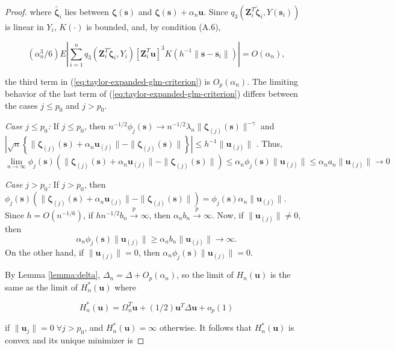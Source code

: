 \documentclass[authoryear,review, 12pt]{elsarticle}
\begin{document}
\begin{proof}
where $\tilde{\bm{\zeta}_{i}}$ lies between $\bm{\zeta}(\bm{s})$
and $\bm{\zeta}(\bm{s})+\alpha_{n}\bm{u}$. Since $q_{3}\left(\bm{Z}_{i}^{T}\tilde{\bm{\zeta}}_{i},Y\left(\bm{s}_{i}\right)\right)$
is linear in $Y_{i}$, $K\left(\cdot\right)$ is bounded, and, by
condition (A.6),

\[
\left(\alpha_{n}^{3}/6\right)E\left|\sum_{i=1}^{n}q_{3}\left(\bm{Z}_{i}^{T}\tilde{\bm{\zeta}}_{i},Y_{i}\right)\left[\bm{Z}_{i}^{T}\bm{u}\right]^{3}K\left(h^{-1}\|\bm{s}-\bm{s}_{i}\|\right)\right|=O\left(\alpha_{n}\right),
\]


the third term in (\ref{eq:taylor-expanded-glm-criterion}) is $O_{p}\left(\alpha_{n}\right)$.
The limiting behavior of the last term of (\ref{eq:taylor-expanded-glm-criterion})
differs between the cases $j\le p_{0}$ and $j>p_{0}$.

\emph{Case $j\le p_{0}$:} If $j\le p_{0}$, then $n^{-1/2}\phi_{j}(\bm{s})\to n^{-1/2}\lambda_{n}\|\bm{\zeta}_{\left(j\right)}(\bm{s})\|^{-\gamma}$
and $|\sqrt{n}\left\{ \|\bm{\zeta}_{\left(j\right)}(\bm{s})+\alpha_{n}\bm{u}_{\left(j\right)}\|-\|\bm{\zeta}_{\left(j\right)}(\bm{s})\|\right\} |\le h^{-1}\|\bm{u}_{\left(j\right)}\|$
. Thus, 
\[
\lim\limits _{n\to\infty}\phi_{j}(\bm{s})\left(\|\bm{\zeta}_{\left(j\right)}(\bm{s})+\alpha_{n}\bm{u}_{\left(j\right)}\|-\|\bm{\zeta}_{\left(j\right)}(\bm{s})\|\right)\le\alpha_{n}\phi_{j}(\bm{s})\|\bm{u}_{\left(j\right)}\|\le\alpha_{n}a_{n}\|\bm{u}_{\left(j\right)}\|\to0
\]


\emph{Case $j>p_{0}$:} If $j>p_{0}$, then $\phi_{j}(\bm{s})\left(\|\bm{\zeta}_{\left(j\right)}(\bm{s})+\alpha_{n}\bm{u}_{\left(j\right)}\|-\|\bm{\zeta}_{\left(j\right)}(\bm{s})\|\right)=\phi_{j}(\bm{s})\alpha_{n}\|\bm{u}_{\left(j\right)}\|$.
Since $h=O(n^{-1/6})$, if $hn^{-1/2}b_{n}\xrightarrow{p}\infty$,
then $\alpha_{n}b_{n}\xrightarrow{p}\infty$. Now, if $\|\bm{u}_{\left(j\right)}\|\ne0$,
then 
\[
\alpha_{n}\phi_{j}(\bm{s})\|\bm{u}_{\left(j\right)}\|\ge\alpha_{n}b_{n}\|\bm{u}_{\left(j\right)}\|\to\infty.
\]
On the other hand, if $\|\bm{u}_{\left(j\right)}\|=0$, then $\alpha_{n}\phi_{j}(\bm{s})\|\bm{u}_{\left(j\right)}\|=0$.

By Lemma \ref{lemma:delta}, $\Delta_{n}=\Delta+O_{p}\left(\alpha_{n}\right)$,
so the limit of $H_{n}\left(\bm{u}\right)$ is the same as the limit
of $H_{n}^{*}\left(\bm{u}\right)$ where

\[
H_{n}^{*}\left(\bm{u}\right)=\Omega_{n}^{T}\bm{u}+(1/2)\bm{u}^{T}\Delta\bm{u}+o_{p}\left(1\right)
\]
 

if $\|\bm{u}_{j}\|=0\;\forall j>p_{0}$, and $H_{n}^{*}\left(\bm{u}\right)=\infty$
otherwise. It follows that $H_{n}^{*}\left(\bm{u}\right)$ is convex
and its unique minimizer is


\end{proof}
\end{document}
